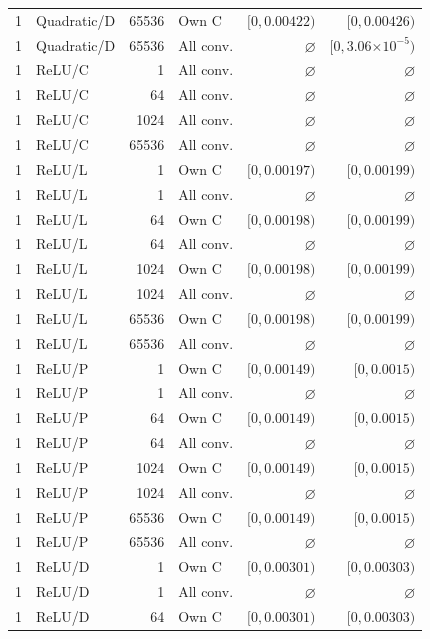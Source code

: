 \begin{longtable}{llrlrr}
1 & Quadratic/D & 65536 & Own C & $[0, 0.00422)$ & $[0, 0.00426)$ \\
1 & Quadratic/D & 65536 & All conv. & $\varnothing$ & $[0, 3.06\mathord{\times}10^{-5})$ \\
1 & ReLU/C & 1 & All conv. & $\varnothing$ & $\varnothing$ \\
1 & ReLU/C & 64 & All conv. & $\varnothing$ & $\varnothing$ \\
1 & ReLU/C & 1024 & All conv. & $\varnothing$ & $\varnothing$ \\
1 & ReLU/C & 65536 & All conv. & $\varnothing$ & $\varnothing$ \\
1 & ReLU/L & 1 & Own C & $[0, 0.00197)$ & $[0, 0.00199)$ \\
1 & ReLU/L & 1 & All conv. & $\varnothing$ & $\varnothing$ \\
1 & ReLU/L & 64 & Own C & $[0, 0.00198)$ & $[0, 0.00199)$ \\
1 & ReLU/L & 64 & All conv. & $\varnothing$ & $\varnothing$ \\
1 & ReLU/L & 1024 & Own C & $[0, 0.00198)$ & $[0, 0.00199)$ \\
1 & ReLU/L & 1024 & All conv. & $\varnothing$ & $\varnothing$ \\
1 & ReLU/L & 65536 & Own C & $[0, 0.00198)$ & $[0, 0.00199)$ \\
1 & ReLU/L & 65536 & All conv. & $\varnothing$ & $\varnothing$ \\
1 & ReLU/P & 1 & Own C & $[0, 0.00149)$ & $[0, 0.0015)$ \\
1 & ReLU/P & 1 & All conv. & $\varnothing$ & $\varnothing$ \\
1 & ReLU/P & 64 & Own C & $[0, 0.00149)$ & $[0, 0.0015)$ \\
1 & ReLU/P & 64 & All conv. & $\varnothing$ & $\varnothing$ \\
1 & ReLU/P & 1024 & Own C & $[0, 0.00149)$ & $[0, 0.0015)$ \\
1 & ReLU/P & 1024 & All conv. & $\varnothing$ & $\varnothing$ \\
1 & ReLU/P & 65536 & Own C & $[0, 0.00149)$ & $[0, 0.0015)$ \\
1 & ReLU/P & 65536 & All conv. & $\varnothing$ & $\varnothing$ \\
1 & ReLU/D & 1 & Own C & $[0, 0.00301)$ & $[0, 0.00303)$ \\
1 & ReLU/D & 1 & All conv. & $\varnothing$ & $\varnothing$ \\
1 & ReLU/D & 64 & Own C & $[0, 0.00301)$ & $[0, 0.00303)$ \\

\end{longtable}
